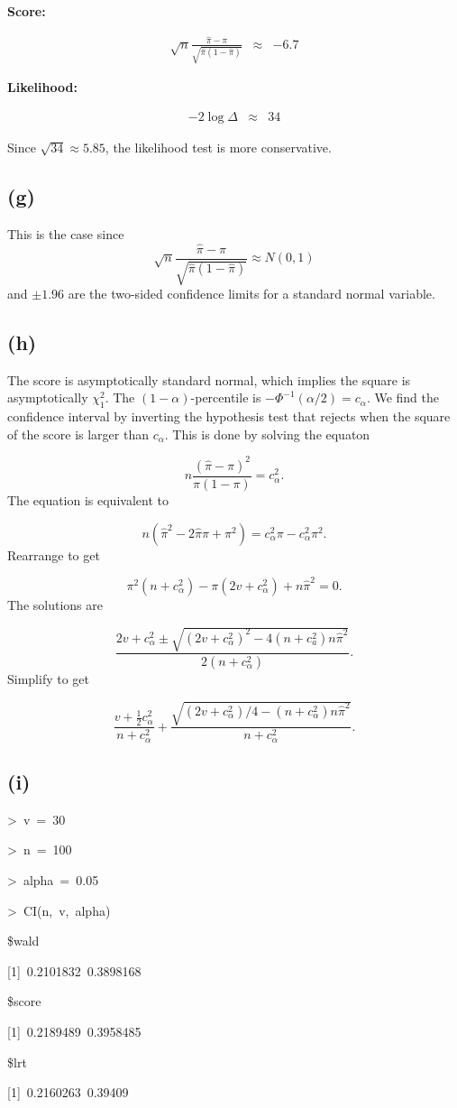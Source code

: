\textbf{Score:}

\begin{eqnarray*}
\sqrt{n}\frac{\hat{\pi}-\pi}{\sqrt{\hat{\pi}(1-\hat{\pi})}} & \approx & -6.7
\end{eqnarray*}

\textbf{Likelihood:}

\begin{eqnarray*}
-2\log\Delta & \approx & 34
\end{eqnarray*}

Since $\sqrt{34}\approx5.85$, the likelihood test is more conservative.

\subsection*{(g)}

This is the case since 
\[
\sqrt{n}\frac{\hat{\pi}-\pi}{\sqrt{\hat{\pi}(1-\hat{\pi})}}\approx N(0,1)
\]
and $\pm 1.96$ are the two-sided confidence limits for a standard
normal variable.

\subsection*{(h)}

The score is asymptotically standard normal, which implies the square
is asymptotically $\chi_{1}^{2}$. The $(1-\alpha)$-percentile is
$-\Phi^{-1}(\alpha/2)=c_{\alpha}$. We find the confidence interval
by inverting the hypothesis test that rejects when the square of the
score is larger than $c_{\alpha}$. This is done by solving the equaton

\[
n\frac{(\hat{\pi}-\pi)^{2}}{\pi(1-\pi)}=c_{\alpha}^{2}.
\]
The equation is equivalent to

\[
n(\hat{\pi}^{2}-2\hat{\pi}\pi+\pi^{2})=c_{\alpha}^{2}\pi-c_{\alpha}^{2}\pi^{2}.
\]
Rearrange to get

\[
\pi^{2}(n+c_{\alpha}^{2})-\pi(2v+c_{\alpha}^{2})+n\hat{\pi}^{2}=0.
\]
The solutions are

\[
\frac{2v+c_{\alpha}^{2}\pm\sqrt{(2v+c_{\alpha}^{2})^{2}-4(n+c_{a}^{2})n\hat{\pi}^{2}}}{2(n+c_{\alpha}^{2})}.
\]
Simplify to get

\[
\frac{v+\frac{1}{2}c_{\alpha}^{2}}{n+c_{\alpha}^{2}}+\frac{\sqrt{(2v+c_{\alpha}^{2})/4-(n+c_{\alpha}^{2})n\hat{\pi}^{2}}}{n+c_{\alpha}^{2}}.
\]


\subsection*{(i)}
\begin{lyxcode}
>~v~=~30

>~n~=~100

>~alpha~=~0.05

>~CI(n,~v,~alpha)

\$wald

{[}1{]}~0.2101832~0.3898168

\$score

{[}1{]}~0.2189489~0.3958485

\$lrt

{[}1{]}~0.2160263~0.39409
\end{lyxcode}

